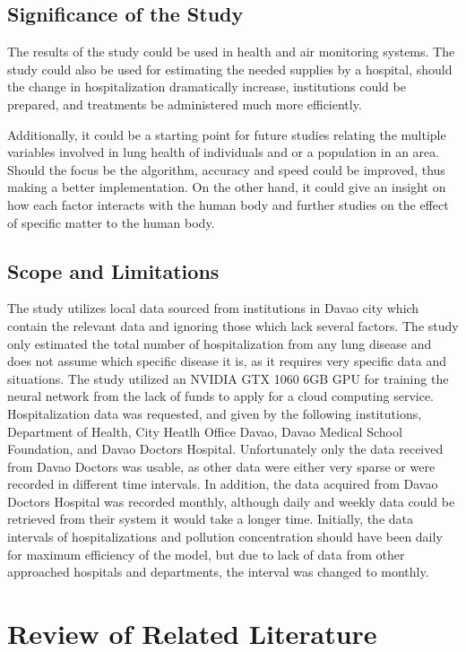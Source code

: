 \documentclass[10pt,11pt,12pt,oneside]{book}
\begin{document}
    \section{Significance of the Study}
    The results of the study could be used in health and air monitoring systems. The study could also be used for estimating the needed supplies by a hospital, should the change in hospitalization dramatically increase, institutions could be prepared, and treatments be administered much more efficiently.

    Additionally, it could be a starting point for future studies relating the multiple variables involved in lung health of individuals and or a population in an area. Should the focus be the algorithm, accuracy and speed could be improved, thus making a better implementation. On the other hand, it could give an insight on how each factor interacts with the human body and further studies on the effect of specific matter to the human body.
    \section{Scope and Limitations}
    The study utilizes local data sourced from institutions in Davao city which contain the relevant data and ignoring those which lack several factors. The study only estimated the total number of hospitalization from any lung disease and does not assume which specific disease it is, as it requires very specific data and situations. The study utilized an NVIDIA GTX 1060 6GB GPU for training the neural network from the lack of funds to apply for a cloud computing service.\\

    Hospitalization data was requested, and given by the following institutions, Department of Health, City Heatlh Office Davao, Davao Medical School Foundation, and Davao Doctors Hospital. Unfortunately only the data received from Davao Doctors was usable, as other data were either very sparse or were recorded in different time intervals. In addition, the data acquired from Davao Doctors Hospital was recorded monthly, although daily and weekly data could be retrieved from
their system it would take a longer time. Initially, the data intervals of hospitalizations and pollution concentration should have been daily for maximum efficiency of the model, but due to lack of data from other approached hospitals and departments, the interval was changed to monthly.
\chapter{Review of Related Literature}
\end{document}
